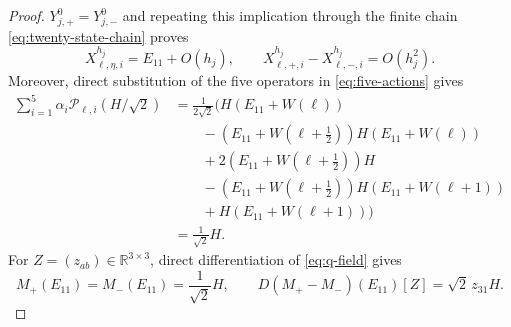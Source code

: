 \documentclass[10pt,a4paper]{amsart}
\numberwithin{equation}{section}
\begin{document}
\begin{proof}
$Y^0_{j,+}=Y^0_{j,-}$ and repeating this implication through the finite
chain \eqref{eq:twenty-state-chain} proves
\begin{equation}\label{eq:actual-limit-estimates}
 X^{h_j}_{\ell,\eta,i}=E_{11}+O(h_j),\qquad
 X^{h_j}_{\ell,+,i}-X^{h_j}_{\ell,-,i}=O(h_j^2).
\end{equation}
Moreover, direct substitution of the five operators in
\eqref{eq:five-actions} gives
\begin{equation}\label{eq:first-order-identity}
\begin{aligned}
 \sum_{i=1}^5\alpha_i\mathcal P_{\ell,i}(H/\sqrt2)
 &=\frac1{2\sqrt2}\bigl(
 H(E_{11}+W(\ell))\\
 &\qquad -(E_{11}+W(\ell+\tfrac12))H(E_{11}+W(\ell))\\
 &\qquad +2(E_{11}+W(\ell+\tfrac12))H\\
 &\qquad -(E_{11}+W(\ell+\tfrac12))H(E_{11}+W(\ell+1))\\
 &\qquad +H(E_{11}+W(\ell+1))\bigr)\\
 &=\frac1{\sqrt2}H.
\end{aligned}
\end{equation}
For $Z=(z_{ab})\in\mathbb R^{3\times3}$, direct differentiation of
\eqref{eq:q-field} gives
\begin{equation}\label{eq:centered-derivative}
 M_+(E_{11})=M_-(E_{11})=\frac1{\sqrt2}H,
 \qquad
 D(M_+-M_-)(E_{11})[Z]=\sqrt2\,z_{31}H.
\end{equation}


\end{proof}
\end{document}
